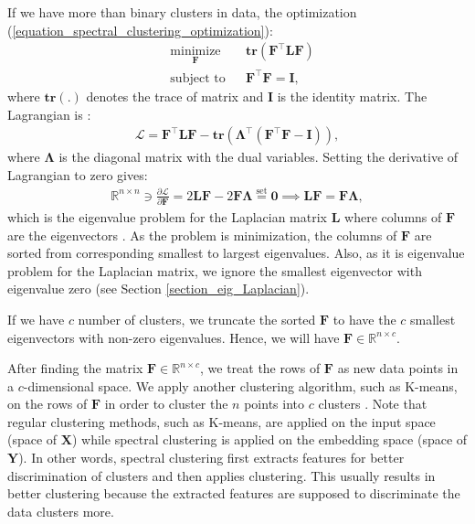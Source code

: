 \documentclass[lang=cn,10pt]{gorgeousnbook}
\numberwithin{equation}{section}%
\numberwithin{figure}{section}%
\begin{document}
If we have more than binary clusters in data, the optimization (\ref{equation_spectral_clustering_optimization}):
\begin{equation}\label{equation_spectral_clustering_optimization_multiple}
\begin{aligned}
& \underset{\boldsymbol{F}}{\text{minimize}}
& & \textbf{tr}(\boldsymbol{F}^\top \boldsymbol{L} \boldsymbol{F}) \\
& \text{subject to}
& & 
\boldsymbol{F}^\top \boldsymbol{F} = \boldsymbol{I},
\end{aligned}
\end{equation}
where $\textbf{tr}(.)$ denotes the trace of matrix and $\boldsymbol{I}$ is the identity matrix.
The Lagrangian is \cite{boyd2004convex}:
\begin{align*}
\mathcal{L} = \boldsymbol{F}^\top \boldsymbol{L} \boldsymbol{F} - \textbf{tr}(\boldsymbol{\Lambda}^\top (\boldsymbol{F}^\top \boldsymbol{F} - \boldsymbol{I})),
\end{align*}
where $\boldsymbol{\Lambda}$ is the diagonal matrix with the dual variables. Setting the derivative of Lagrangian to zero gives:
\begin{align}\label{equation_spectral_clustering_eig_problem}
\mathbb{R}^{n \times n} \ni \frac{\partial \mathcal{L}}{\partial \boldsymbol{F}} = 2 \boldsymbol{L} \boldsymbol{F} - 2 \boldsymbol{F} \boldsymbol{\Lambda} \overset{\text{set}}{=} \boldsymbol{0} \implies \boldsymbol{L} \boldsymbol{F} = \boldsymbol{F} \boldsymbol{\Lambda},
\end{align}
which is the eigenvalue problem for the Laplacian matrix $\boldsymbol{L}$ where columns of $\boldsymbol{F}$ are the eigenvectors \cite{ghojogh2019eigenvalue}. 
As the problem is minimization, the columns of $\boldsymbol{F}$ are sorted from corresponding smallest to largest eigenvalues. Also, as it is eigenvalue problem for the Laplacian matrix, we ignore the smallest eigenvector with eigenvalue zero (see Section \ref{section_eig_Laplacian}). 

If we have $c$ number of clusters, we truncate the sorted $\boldsymbol{F}$ to have the $c$ smallest eigenvectors with non-zero eigenvalues. Hence, we will have $\boldsymbol{F} \in \mathbb{R}^{n \times c}$. 

After finding the matrix $\boldsymbol{F} \in \mathbb{R}^{n \times c}$, we treat the rows of $\boldsymbol{F}$ as new data points in a $c$-dimensional space. 
We apply another clustering algorithm, such as K-means, on the rows of $\boldsymbol{F}$ in order to cluster the $n$ points into $c$ clusters \cite{ng2001spectral}. 
Note that regular clustering methods, such as K-means, are applied on the input space (space of $\boldsymbol{X}$) while spectral clustering is applied on the embedding space (space of $\boldsymbol{Y}$). In other words, spectral clustering first extracts features for better discrimination of clusters and then applies clustering. This usually results in better clustering because the extracted features are supposed to discriminate the data clusters more. 
\end{document}

